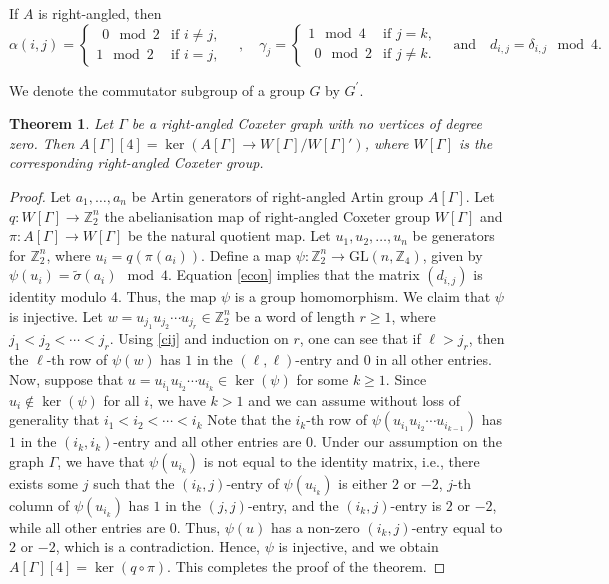 \documentclass[12pt]{amsart}
\newtheorem{theorem}[equation]{Theorem}
\theoremstyle{definition}
\numberwithin{equation}{section}
\newcommand{\GL}{\mathrm{GL}}
\begin{document}
If $A$  is right-angled, then
\begin{equation}\label{econ}
\alpha(i,j)=\begin{cases}
~~0\mod 2 &\text{if } i\neq j,\\
1\mod 2&\text{if } i = j,
    \end{cases} \quad , \quad \gamma_j=\begin{cases} 1\mod 4 & \text{if } j=k,\\
    ~~0 \mod 2 &\text{if } j\neq k.
    \end{cases} \quad \textrm{and} \quad d_{i,j} = \delta_{i,j} \mod 4.
\end{equation}


We denote the commutator subgroup of a group $G$ by $G^{'}$.

\begin{theorem}\label{thm:level 4}
Let $\Gamma$ be a right-angled Coxeter graph with no vertices of degree zero. Then  $A[\Gamma][4]= \ker (A[\Gamma] \to W[\Gamma]/W[\Gamma]')$, where $W[\Gamma]$ is the corresponding right-angled Coxeter group.
\end{theorem}
\begin{proof}
 Let $a_1, \ldots, a_n$ be Artin generators of right-angled Artin group $A[\Gamma]$. Let $q:W[\Gamma]\to \mathbb Z_2^{n}$ the abelianisation map of right-angled Coxeter group $W[\Gamma]$ and $\pi:A[\Gamma]\to W[\Gamma]$ be the natural quotient map.  Let $u_1,u_2,\ldots,u_{n}$ be generators for $\mathbb Z_2^{n}$, where $u_i=q(\pi(a_i))$.  Define a map $\psi:\mathbb Z_2^n \to \GL(n,\mathbb Z_4)$, given by $\psi(u_i)=\tilde{\sigma}(a_i) \mod 4$.  Equation \eqref{econ} implies that the matrix $(d_{i,j})$ is identity modulo 4.  Thus, the map $\psi$ is a group homomorphism. We claim that $\psi$ is injective. Let $w=u_{j_1}u_{j_2}\cdots u_{j_r} \in  \mathbb Z_2^{n}$ be a word of length $r \ge 1$, where $j_1<j_2<\cdots < j_r$. Using \eqref{cij} and induction on $r$, one can see that if $\ell>j_r$, then the $\ell$-th row of $\psi(w)$ has $1$ in the $(\ell,\ell)$-entry and $0$ in all other entries. Now, suppose that  $u=u_{i_1}u_{i_2}\cdots u_{i_k} \in \ker(\psi)$ for some $k\ge1$. Since $u_i \not\in \ker(\psi)$ for all $i$, we have $k>1$ and we can assume without loss of generality that $i_1<i_2<\cdots < i_k$ Note that the $i_k$-th row of $\psi(u_{i_1}u_{i_2}\cdots u_{i_{k-1}})$ has $1$ in the $(i_k,i_k)$-entry and all other entries are 0. Under our assumption on the graph $\Gamma$, we have that  $\psi(u_{i_k})$  is not equal to the identity matrix, i.e., there exists some $j$ such that the $(i_k, j)$-entry of $\psi(u_{i_k})$ is either $2$ or $-2$, $j$-th column of $\psi(u_{i_k})$ has $1$ in the $(j,j)$-entry, and the $(i_k, j)$-entry is $2$ or $-2$, while all other entries are 0. Thus, $\psi(u)$ has a non-zero $(i_k,j)$-entry equal to $2$ or $-2$, which is a contradiction. Hence, $\psi$ is injective, and we obtain $A[\Gamma][4]=\ker(q\circ \pi)$. This completes the proof of the theorem.
\end{proof}
\end{document}
